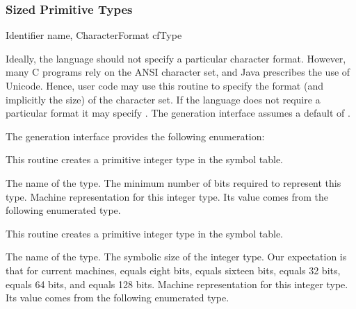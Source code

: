 \subsubsection{Sized Primitive Types}

	{Identifier name, CharacterFormat cf}{}{Type} 
\begin{functionality}
Ideally, the language should not specify a particular character
format.  However, many C programs rely on the ANSI character set, and
Java prescribes the use of Unicode.  Hence, user code may use this
routine to specify the format (and implicitly the size) of the
character set.  If the language does not require a particular format
it may specify .  The generation interface assumes a default
of .

The generation interface provides the following enumeration:
\end{functionality}

\begin{functionality}
This routine creates a primitive integer type in the symbol table.
\begin{Parameters}
 The name of the type.
 The minimum number of bits required to represent 
this type.
 Machine representation for this integer type.  Its value
comes from the following enumerated type.
\end{Parameters}
\end{functionality}

\begin{functionality}
This routine creates a primitive integer type in the symbol table.
\begin{Parameters}
 The name of the type.
 The symbolic size of the integer type.
Our expectation is that for current machines,  equals
eight bits,  equals sixteen bits,  equals 32
bits,  equals 64 bits, and  equals 128 bits.
 Machine representation for this integer type.  Its value
comes from the following enumerated type.
\end{Parameters}
\end{functionality}

